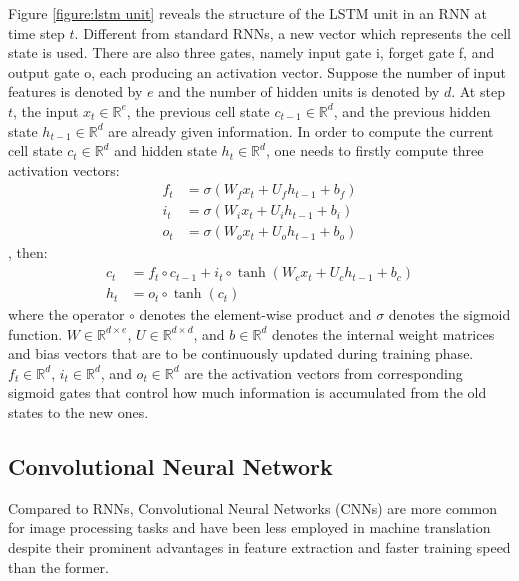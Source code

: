 Figure \ref{figure:lstm unit} reveals the structure of the LSTM unit in an RNN at time step $ t $. Different from standard RNNs, a new vector which represents the cell state is used. There are also three gates, namely input gate i, forget gate f, and output gate o, each producing an activation vector. Suppose the number of input features is denoted by $ e $ and the number of hidden units is denoted by $ d $. At step $ t $, the input $ x_{t} \in \mathbb{R}^{e} $, the previous cell state $ c_{t-1} \in \mathbb{R}^{d} $, and the previous hidden state $ h_{t-1} \in \mathbb{R}^{d} $ are already given information. In order to compute the current cell state $ c_{t} \in \mathbb{R}^{d} $ and hidden state $ h_{t} \in \mathbb{R}^{d} $, one needs to firstly compute three activation vectors:
\begin{align*}
f_{t} &= \sigma(W_{f}x_{t}+U_{f}h_{t-1}+b_{f}) \\
i_{t} &= \sigma(W_{i}x_{t}+U_{i}h_{t-1}+b_{i}) \\
o_{t} &= \sigma(W_{o}x_{t}+U_{o}h_{t-1}+b_{o})
\end{align*}
, then:
\begin{align*}
c_{t} &= f_{t}\circ c_{t-1}+i_{t}\circ \tanh(W_{c}x_{t}+U_{c}h_{t-1}+b_{c}) \\
h_{t} &= o_{t}\circ \tanh(c_{t})
\end{align*}
where the operator $ \circ $ denotes the element-wise product and $ \sigma $ denotes the sigmoid function. $ W \in \mathbb{R}^{d\times e} $, $ U \in \mathbb{R}^{d \times d} $, and $ b \in \mathbb{R}^{d} $ denotes the internal weight matrices and bias vectors that are to be continuously updated during training phase. $ f_{t} \in \mathbb{R}^{d} $, $ i_{t} \in \mathbb{R}^{d} $, and $ o_{t} \in \mathbb{R}^{d} $ are the activation vectors from corresponding sigmoid gates that control how much information is accumulated from the old states to the new ones.

\subsection{Convolutional Neural Network} \label{subsection:cnn}

Compared to RNNs, Convolutional Neural Networks (CNNs) are more common for image processing tasks and have been less employed in machine translation despite their prominent advantages in feature extraction and faster training speed than the former. 

